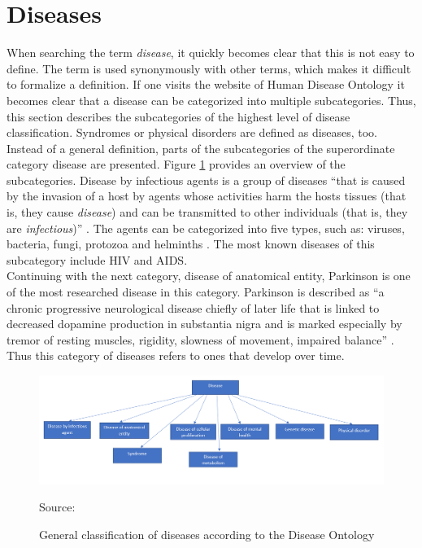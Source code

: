 \section{Diseases}
When searching the term \textit{disease}, it quickly becomes clear that this is not easy to define. The term is used synonymously with other terms, which makes it difficult to formalize a definition. If one visits the website of Human Disease Ontology \citep{noauthor_disease_nodate} it becomes clear that a disease can be categorized into multiple subcategories. Thus, this section describes the subcategories of the highest level of disease classification. Syndromes or physical disorders are defined as diseases, too. Instead of a general definition, parts of the subcategories of the superordinate category disease are presented. Figure \ref{fig:disease_tree} provides an overview of the subcategories. Disease by infectious agents is a group of diseases \enquote{that is caused by the invasion of a host by agents whose activities harm the hosts tissues (that is, they cause \textit{disease}) and can be transmitted to other individuals (that is, they are \textit{infectious})} \citep{health_us_understanding_2007}. The agents can be categorized into five types, such as: viruses, bacteria, fungi, protozoa and helminths \citep{charles_a_janeway_infectious_2001}. The most known diseases of this subcategory include \ac{HIV} and \ac{AIDS}. \\

Continuing with the next category, disease of anatomical entity, Parkinson is one of the most researched disease in this category. Parkinson is described as \enquote{a chronic progressive neurological disease chiefly of later life that is linked to decreased dopamine production in substantia nigra and is marked especially by tremor of resting muscles, rigidity, slowness of movement, impaired balance} \citep{noauthor_definition_nodate}. Thus this category of diseases refers to ones that develop over time.\\

\begin{figure}[H]
\centering
\includegraphics[scale=0.6]{bilder/Disease.PNG}
\caption{General classification of diseases according to the Disease Ontology}
Source: \citep{noauthor_disease_nodate}
\label{fig:disease_tree}
\end{figure}

